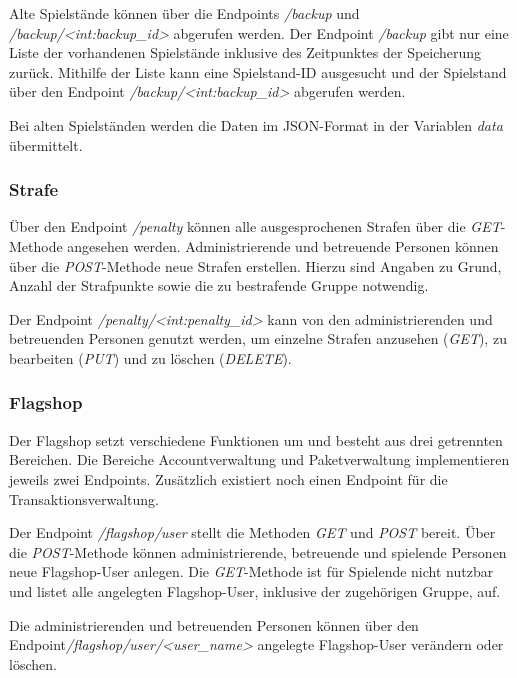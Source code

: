 Alte Spielstände können über die Endpoints \textit{/backup} und \textit{/backup/<int:backup\_id>} abgerufen werden.
Der Endpoint \textit{/backup} gibt nur eine Liste der vorhandenen Spielstände inklusive des Zeitpunktes der Speicherung zurück. Mithilfe der Liste kann eine Spielstand-ID ausgesucht und der Spielstand über den Endpoint \textit{/backup/<int:backup\_id>} abgerufen werden.

Bei alten Spielständen werden die Daten im JSON-Format in der Variablen \textit{data} übermittelt.

\subsubsection{Strafe}
Über den Endpoint \textit{/penalty} können alle ausgesprochenen Strafen über die \textit{GET}-Methode \linebreak angesehen werden. Administrierende und betreuende Personen können über die \linebreak \textit{POST}-Methode neue Strafen erstellen. Hierzu sind Angaben zu Grund, Anzahl der Strafpunkte sowie die zu bestrafende Gruppe notwendig.

Der Endpoint \textit{/penalty/<int:penalty\_id>} kann von den administrierenden und betreuenden Personen genutzt werden, um einzelne Strafen anzusehen (\textit{GET}), zu bearbeiten (\textit{PUT}) und zu löschen (\textit{DELETE}).

\subsubsection{Flagshop}
Der Flagshop setzt verschiedene Funktionen um und besteht aus drei getrennten Bereichen. Die Bereiche Accountverwaltung und Paketverwaltung implementieren jeweils zwei \linebreak Endpoints. Zusätzlich existiert noch einen Endpoint für die Transaktionsverwaltung. 

Der Endpoint \textit{/flagshop/user} stellt die Methoden \textit{GET} und \textit{POST} bereit. Über die \textit{POST}-Methode können administrierende, betreuende und spielende Personen neue Flagshop-User anlegen. Die \textit{GET}-Methode ist für Spielende nicht nutzbar und listet alle angelegten \linebreak Flagshop-User, inklusive der zugehörigen Gruppe, auf.

Die administrierenden und betreuenden Personen können über den Endpoint\linebreak \textit{/flagshop/user/<user\_name>} angelegte Flagshop-User verändern oder löschen.


